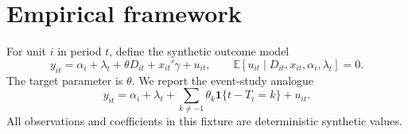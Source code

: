 \section{Empirical framework}\label{sec:methods}

For unit $i$ in period $t$, define the synthetic outcome model
\begin{equation}
  y_{it}=\alpha_i+\lambda_t+\theta D_{it}+x_{it}'\gamma+u_{it},
  \qquad \mathbb{E}[u_{it}\mid D_{it},x_{it},\alpha_i,\lambda_t]=0.
  \label{eq:model}
\end{equation}
The target parameter is $\theta$. We report the event-study analogue
\begin{equation}
  y_{it}=\alpha_i+\lambda_t+
  \sum_{k\neq-1}\theta_k\mathbf{1}\{t-T_i=k\}+u_{it}.
  \label{eq:event-study}
\end{equation}
All observations and coefficients in this fixture are deterministic synthetic
values.
